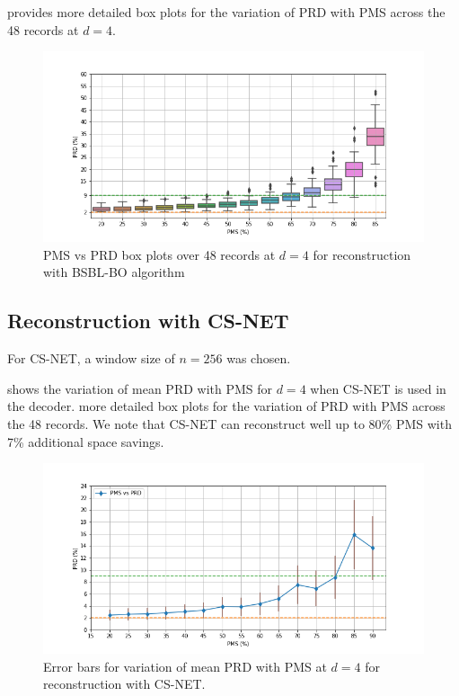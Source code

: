  provides more detailed box plots
for the variation of PRD with PMS across the 48 records at $d=4$.
\begin{figure}[!t]
\centering
\includegraphics[width=0.95\linewidth]{images/bsbl/pms-vs-prd-boxplot-d4.png}
\caption{PMS vs PRD box plots over 48 records at $d=4$ for reconstruction
with BSBL-BO algorithm}
\label{fig-res-bsbl-pms-prd-boxplot-d4}
\end{figure}

\subsection{Reconstruction with CS-NET}
For CS-NET, a window size of $n=256$ was chosen.

 shows the variation
of mean PRD with PMS for $d=4$ when CS-NET is used in the decoder.
  more detailed box plots
for the variation of PRD with PMS across the 48 records.
We note that CS-NET can reconstruct well up to 80\% PMS
with 7\% additional space savings.

\begin{figure}
\centering
\includegraphics[width=0.95\linewidth]{images/csnet/pms-vs-prd-errorbar.png}
\caption{Error bars for variation of mean PRD with PMS at $d=4$ for reconstruction with
CS-NET.}
\label{fig-res-csnet-pms-prd-errorbar}
\end{figure}

